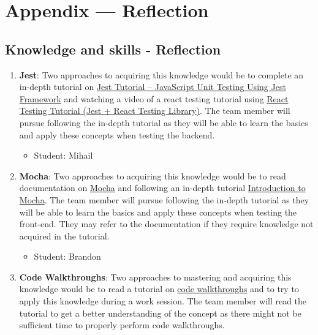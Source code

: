 \documentclass[12pt, titlepage]{article}
\begin{document}
\newpage{}
\section*{Appendix --- Reflection}

\subsection{Knowledge and skills - Reflection  }
\begin{enumerate} %
    \item \textbf{Jest}: Two approaches to acquiring this knowledge would be to complete an in-depth tutorial on \href{https://www.softwaretestinghelp.com/jest-testing-tutorial/}{Jest Tutorial – JavaScript Unit Testing Using Jest Framework} and watching a video of a react testing tutorial using \href{https://www.youtube.com/watch?v=ML5egqL3YFE}{React Testing Tutorial (Jest + React Testing Library)}. The team member will pursue following the in-depth tutorial as they will be able to learn the basics and apply these concepts when testing the backend.
        \begin{itemize}
            \item Student: Mihail 
        \end{itemize}
    \item \textbf{Mocha}: Two approaches to acquiring this knowledge would be to read documentation on \href{https://mochajs.org/}{Mocha} and following an in-depth tutorial \href{https://www.w3resource.com/mocha/getting-started.php}{Introduction to Mocha}. The team member will pursue following the in-depth tutorial as they will be able to learn the basics and apply these concepts when testing the front-end. They may refer to the documentation if they require knowledge not acquired in the tutorial.
        \begin{itemize}
                \item Student: Brandon
            \end{itemize}
    \item \textbf{Code Walkthroughs}: Two approaches to mastering and acquiring this knowledge would be to read a tutorial on \href{https://www.tutorialspoint.com/software_testing_dictionary/code_walkthrough.htm}{code walkthroughs} and to try to apply this knowledge during a work session. The team member will read the tutorial to get a better understanding of the concept as there might not be sufficient time to properly perform code walkthroughs.

\end{enumerate}
\end{document}
